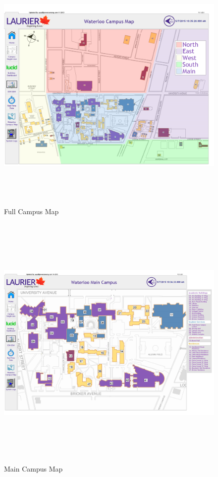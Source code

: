 	\begin{center}
	\begin{figure}
			\includegraphics[height=5in]{../Images/WLU2.png}
		\caption{Full Campus Map}
		\label{fig:CampusMap}
	\end{figure}
	\end{center}


	\begin{center}
	\begin{figure}
			\includegraphics[height=5in]{../Images/WLU3.png}
		\caption{Main Campus Map}
		\label{fig:MainCampusMap}
	\end{figure}
	\end{center}


